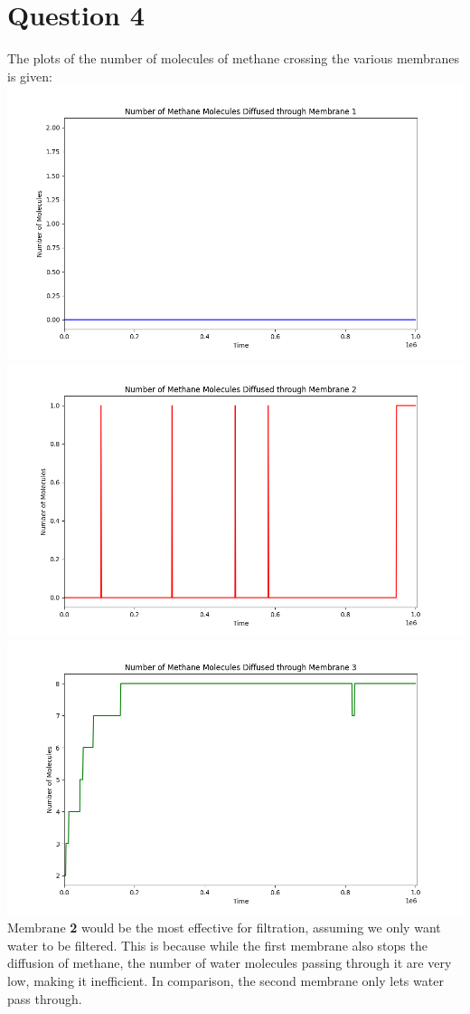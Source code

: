 \documentclass[11pt]{article}
\begin{document}
\section{Question 4}
The plots of the number of molecules of methane crossing the various membranes is given:\\
\includegraphics[scale=0.5]{Q4M1.png} \\ 
\includegraphics[scale=0.5]{Q4M2.png} \\
\includegraphics[scale=0.5]{Q4M3.png} \\
Membrane \textbf{2} would be the most effective for filtration, assuming we only want water to be filtered. This is because while the first membrane also stops the diffusion of methane, the number of water molecules passing through it are very low, making it inefficient. In comparison, the second membrane only lets water pass through.
\end{document}
